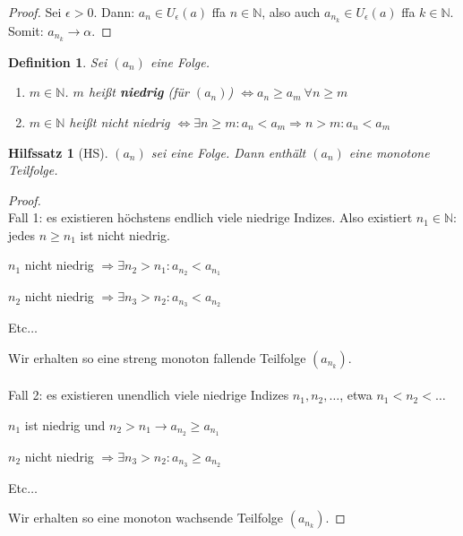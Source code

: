 \documentclass{extreport}
\newcommand{\N}{\mathbb{N}}
\theoremstyle{named}
\theoremstyle{dotless}
\newtheorem*{definition}{Definition}
\newtheorem*{hilfssatz*}{Hilfssatz}
\begin{document}
\begin{proof}
	Sei $\epsilon > 0$. Dann: $a_{n} \in U_{\epsilon}(a)$ ffa $n \in \N$, also auch $a_{n_{k}} \in U_{\epsilon}(a)$ ffa $k \in \N$. Somit: $a_{n_{k}} \rightarrow \alpha$.
\end{proof}

\begin{definition} Sei $(a_{n})$ eine Folge. 
	\begin{enumerate}
		\item $m \in \N$. $m$ hei{\ss}t \textbf{niedrig} (für $(a_{n})$) $\iff a_{n} \geq a_{m} ~\forall n \geq m $
		\item $m \in \N$ hei{\ss}t nicht niedrig $\iff \exists n \geq m: a_{n} < a_{m} \Rightarrow n > m: a_{n} < a_{m}$
	\end{enumerate}
\end{definition}


\begin{hilfssatz*}[HS]
	$(a_{n})$ sei eine Folge. Dann enthält $(a_{n})$ eine monotone Teilfolge.	
\end{hilfssatz*}

\begin{proof} ~\\
	Fall 1: es existieren höchstens endlich viele niedrige Indizes. Also existiert $n_{1} \in \N$: jedes $n \geq n_{1}$ ist nicht niedrig.
	\begin{description}
		\item $n_{1}$ nicht niedrig $\Rightarrow \exists n_{2} > n_{1} : a_{n_{2}} < a_{n_{1}}$
		\item $n_{2}$ nicht niedrig $\Rightarrow \exists n_{3} > n_{2} : a_{n_{3}} < a_{n_{2}}$
		\item Etc$\dotsc$
	\end{description}
	Wir erhalten so eine streng monoton fallende Teilfolge $(a_{n_{k}})$. \\ \\
	Fall 2: es existieren unendlich viele niedrige Indizes $n_{1}, n_{2}, \dotsc$, etwa $n_{1} < n_{2} < \dotsc$
	\begin{description}
		\item $n_{1}$ ist niedrig und $n_{2} > n_{1} \rightarrow a_{n_{2}} \geq a_{n_{1}}$
		\item $n_{2}$ nicht niedrig $\Rightarrow \exists n_{3} > n_{2} : a_{n_{3}} \geq a_{n_{2}}$
		\item Etc$\dotsc$
	\end{description}
	Wir erhalten so eine monoton wachsende Teilfolge $(a_{n_{k}})$.
\end{proof}
\end{document}
